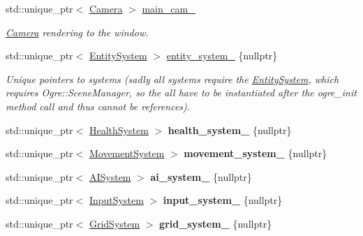 \begin{DoxyCompactItemize}
\item 
std\+::unique\+\_\+ptr$<$ \hyperlink{class_camera}{Camera} $>$ \hyperlink{class_game_a0376227db8220eefaf7f6ac310c091f7}{main\+\_\+cam\+\_\+}
\begin{DoxyCompactList}\small\item\em \hyperlink{class_camera}{Camera} rendering to the window. \end{DoxyCompactList}\item 
std\+::unique\+\_\+ptr$<$ \hyperlink{class_entity_system}{Entity\+System} $>$ \hyperlink{class_game_ab64dd8e6b94e4ea96da9cba633524cdb}{entity\+\_\+system\+\_\+} \{nullptr\}
\begin{DoxyCompactList}\small\item\em Unique pointers to systems (sadly all systems require the \hyperlink{class_entity_system}{Entity\+System}, which requires Ogre\+::\+Scene\+Manager, so the all have to be instantiated after the ogre\+\_\+init method call and thus cannot be references). \end{DoxyCompactList}\item 
std\+::unique\+\_\+ptr$<$ \hyperlink{class_health_system}{Health\+System} $>$ {\bfseries health\+\_\+system\+\_\+} \{nullptr\}\hypertarget{class_game_af74712bd1667aa653794d9faf843c844}{}\label{class_game_af74712bd1667aa653794d9faf843c844}

\item 
std\+::unique\+\_\+ptr$<$ \hyperlink{class_movement_system}{Movement\+System} $>$ {\bfseries movement\+\_\+system\+\_\+} \{nullptr\}\hypertarget{class_game_a67305bc37d65d7dd32e7a523576d9c52}{}\label{class_game_a67305bc37d65d7dd32e7a523576d9c52}

\item 
std\+::unique\+\_\+ptr$<$ \hyperlink{class_a_i_system}{A\+I\+System} $>$ {\bfseries ai\+\_\+system\+\_\+} \{nullptr\}\hypertarget{class_game_ab7a06b3de828f2e6150acf1663e1183a}{}\label{class_game_ab7a06b3de828f2e6150acf1663e1183a}

\item 
std\+::unique\+\_\+ptr$<$ \hyperlink{class_input_system}{Input\+System} $>$ {\bfseries input\+\_\+system\+\_\+} \{nullptr\}\hypertarget{class_game_ab2c619644c9f7e5701aec29258956f50}{}\label{class_game_ab2c619644c9f7e5701aec29258956f50}

\item 
std\+::unique\+\_\+ptr$<$ \hyperlink{class_grid_system}{Grid\+System} $>$ {\bfseries grid\+\_\+system\+\_\+} \{nullptr\}\hypertarget{class_game_ab78af70efdfac02836b368fcf434a750}{}\label{class_game_ab78af70efdfac02836b368fcf434a750}


\end{DoxyCompactItemize}
